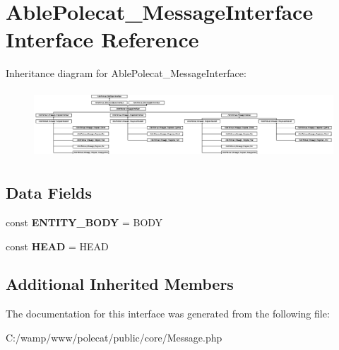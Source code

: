 \hypertarget{interface_able_polecat___message_interface}{}\section{Able\+Polecat\+\_\+\+Message\+Interface Interface Reference}
\label{interface_able_polecat___message_interface}
Inheritance diagram for Able\+Polecat\+\_\+\+Message\+Interface\+:\begin{figure}[H]
\begin{center}
\leavevmode
\includegraphics[height=2.545455cm]{interface_able_polecat___message_interface}
\end{center}
\end{figure}
\subsection*{Data Fields}
\begin{DoxyCompactItemize}
\item 
\hypertarget{interface_able_polecat___message_interface_a1b32af236e7e6a142206653f9f10f22c}{}const {\bfseries E\+N\+T\+I\+T\+Y\+\_\+\+B\+O\+D\+Y} = \textquotesingle{}B\+O\+D\+Y\textquotesingle{}\label{interface_able_polecat___message_interface_a1b32af236e7e6a142206653f9f10f22c}

\item 
\hypertarget{interface_able_polecat___message_interface_a43d3cf541a304c995ca17a9fd44d69e9}{}const {\bfseries H\+E\+A\+D} = \textquotesingle{}H\+E\+A\+D\textquotesingle{}\label{interface_able_polecat___message_interface_a43d3cf541a304c995ca17a9fd44d69e9}

\end{DoxyCompactItemize}
\subsection*{Additional Inherited Members}


The documentation for this interface was generated from the following file\+:\begin{DoxyCompactItemize}
\item 
C\+:/wamp/www/polecat/public/core/Message.\+php\end{DoxyCompactItemize}
